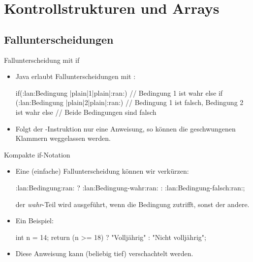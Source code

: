 
\section{Kontrollstrukturen und Arrays}
\subsection{Fallunterscheidungen}

\begin{frame}[fragile]{Fallunterscheidung mit if}
    \begin{itemize}[<+(1)->]
        \item Java erlaubt Fallunterscheidungen mit :\pause{}
\begin{plainjava}
if(:lan:Bedingung |plain|1|plain|:ran:){
    // Bedingung 1 ist wahr
} else if (:lan:Bedingung |plain|2|plain|:ran:) {
    // Bedingung 1 ist falsch, Bedingung 2 ist wahr
} else {
    // Beide Bedingungen sind falsch
}
\end{plainjava}
    \item Folgt der -Instruktion nur eine Anweisung,\pause{} so können die geschwungenen Klammern weggelassen werden.
    \end{itemize}
\end{frame}


\begin{frame}[fragile]{Kompakte if-Notation}
    \begin{itemize}[<+(1)->]
        \item Eine (einfache) Fallunterscheidung können wir verkürzen:\pause{}
\begin{plainjava}
:lan:Bedingung:ran: ? :lan:Bedingung-wahr:ran: : :lan:Bedingung-falsch:ran:;
\end{plainjava}
        \pause{}der \emph{wahr}-Teil wird ausgeführt, wenn die Bedingung zutrifft,\pause{} sonst der andere.
        \item Ein Beispiel:\pause{}
\begin{plainjava}
int n = 14;
return (n >= 18) ? "Volljährig" : "Nicht volljährig";
\end{plainjava}
        \item Diese Anweisung kann (beliebig tief) verschachtelt werden.
    \end{itemize}
\end{frame}


